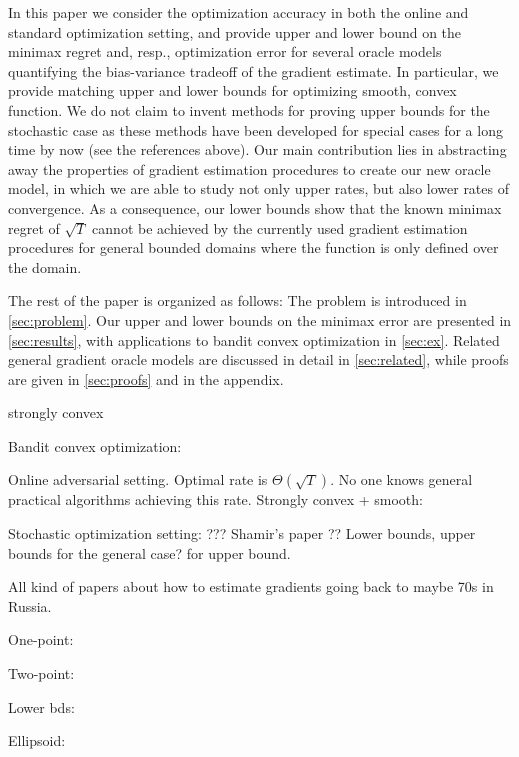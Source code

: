 In this paper we consider the optimization accuracy in both the online and standard optimization setting, and provide upper and lower bound on the minimax regret and, resp., optimization error for several oracle models quantifying the bias-variance tradeoff of the gradient estimate. In particular, we provide matching upper and lower bounds for optimizing smooth, convex function. We do not claim to invent methods for proving upper bounds for the stochastic case
as these methods have been developed for special cases for a long time by now (see the references above).
Our main contribution lies in abstracting away the properties of gradient estimation procedures 
to create our new oracle model, in which we are able to study not only upper rates, but also lower rates of convergence.
As a consequence, our lower bounds show that the known minimax regret of $\sqrt{T}$ \citep{shamir2012complexity} cannot be achieved by the currently used gradient estimation procedures for general bounded domains where the function is only defined over the domain.

The rest of the paper is organized as follows: The problem is introduced in \cref{sec:problem}. Our upper and lower bounds on the minimax error are presented in \cref{sec:results}, with applications to bandit convex optimization in \cref{sec:ex}. Related general gradient oracle models are discussed in detail in \cref{sec:related}, while proofs are given in \cref{sec:proofs} and in the appendix.

strongly convex


Bandit convex optimization:

Online adversarial setting. Optimal rate is $\Theta(\sqrt{T})$.
No one knows general practical algorithms achieving this rate.
Strongly convex + smooth: \cite{hazan2014bandit}

Stochastic optimization setting: ??? Shamir's paper \cite{shamir2012complexity}??
Lower bounds, upper bounds for the general case?
\cite{hazan2014bandit} for upper bound.

All kind of papers about how to estimate gradients going back to maybe 70s in Russia.

One-point: \cite{flaxman2005online}

Two-point: \cite{AgDeXi10}

Lower bds: \cite{raginsky2011information} \cite{Chen88:LB-AoS}

Ellipsoid: \cite{AgFoHsuKaRa13:SIAM}



